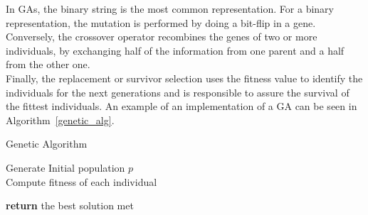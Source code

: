 In  GAs, the binary string is the most common representation. For a binary representation, the mutation is performed by doing a bit-flip in a gene.  Conversely, the crossover operator recombines the genes of two or more individuals, by exchanging half of the information from one parent and a half from the other one. \\




Finally, the replacement or survivor selection uses the fitness value to identify the individuals for the next generations and is responsible to assure the survival of the fittest individuals. An example of an implementation of a GA can be seen in Algorithm~\ref{genetic_alg}. \\

\begin{algorithm}[H]
\caption{Genetic Algorithm}
\label{genetic_alg}
\SetAlgoLined 
Generate Initial population $p$\;\\
Compute fitness of each individual\;\

 \textbf{return} the best solution met\;
\end{algorithm}

